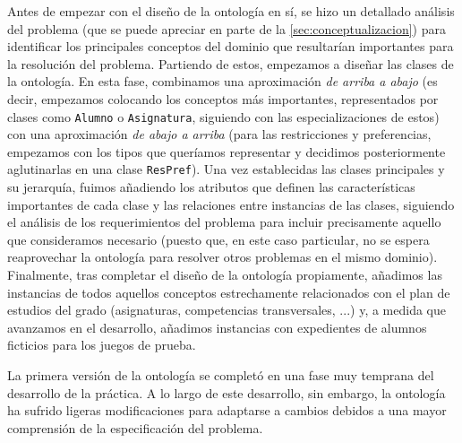 Antes de empezar con el diseño de la ontología en sí, se hizo un detallado 
análisis del problema (que se puede apreciar en parte de la 
\autoref{sec:conceptualizacion}) para identificar los principales conceptos 
del dominio que resultarían importantes para la resolución del problema. 
Partiendo de estos, empezamos a diseñar las clases de la ontología. En esta 
fase, combinamos una aproximación \textit{de arriba a abajo} (es decir, 
empezamos colocando los conceptos más importantes, representados por clases 
como \texttt{Alumno} o \texttt{Asignatura}, siguiendo con las 
especializaciones de estos) con una aproximación \textit{de abajo a arriba} 
(para las restricciones y preferencias, empezamos con los tipos que queríamos 
representar y decidimos posteriormente aglutinarlas en una clase 
\texttt{ResPref}). Una vez establecidas las clases principales y su jerarquía, 
fuimos añadiendo los atributos que definen las características importantes 
de cada clase y las relaciones entre instancias de las clases, siguiendo el 
análisis de los requerimientos del problema para incluir precisamente aquello 
que consideramos necesario (puesto que, en este caso particular, no se espera 
reaprovechar la ontología para resolver otros problemas en el mismo dominio). 
Finalmente, tras completar el diseño de la ontología propiamente, añadimos las 
instancias de todos aquellos conceptos estrechamente relacionados con el plan 
de estudios del grado (asignaturas, competencias transversales, ...) y, a 
medida que avanzamos en el desarrollo, añadimos instancias con expedientes de 
alumnos ficticios para los juegos de prueba.

La primera versión de la ontología se completó en una fase muy temprana del 
desarrollo de la práctica. A lo largo de este desarrollo, sin embargo, la 
ontología ha sufrido ligeras modificaciones para adaptarse a cambios debidos 
a una mayor comprensión de la especificación del problema. 




